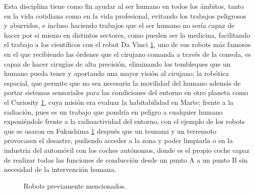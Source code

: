 Esta disciplina tiene como fin ayudar al ser humano en todos los ámbitos, tanto en la vida cotidiana como en la vida profesional, evitando los trabajos peligrosos y aburridos, e incluso haciendo trabajos que el ser humano no sería capaz de hacer por si mismo en distintos sectores, como pueden ser la medicina, facilitando el trabajo a los científicos con  el robot Da Vinci  \ref{fig:robots}, uno de sus robots más famosos en el que recibiendo las órdenes que el cirujano comanda a través de la consola, es capaz de hacer cirugías de alta precisión, eliminando los tembleques que un humano pueda tener y aportando una mayor visión al cirujano; la robótica espacial, que permite que no sea necesaria la movilidad del humano además de portar sistemas sensoriales para las condiciones del entorno en otro planeta como el Curiosity  \ref{fig:robots}, cuya misión era evaluar la habitabilidad en Marte; frente a la radiación, pues es un trabajo que pondría en peligro a cualquier humano exponiéndole frente a la radioactividad del entorno, con el ejemplo de los robots que se usaron en Fukushima \ref{fig:robots} después que un tsunami y un terremoto provocasen el desastre, pudiendo acceder a la zona y poder limpiarla o en la industria del automóvil con los coches autónomos, donde es el propio coche capaz de realizar todas las funciones de conducción desde un punto A a un punto B sin necesidad de la intervención humana.
\begin{figure}[h!]
  \begin{center}
    \hspace{8mm}
    \hspace{8mm}
  \end{center}
\caption{Robots previamente mencionados.} \label{fig:robots}
\end{figure}

